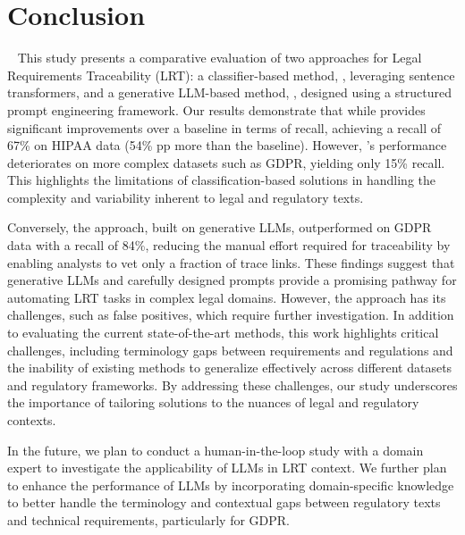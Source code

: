 \section{Conclusion}~\label{sec:conclusion}
This study presents a comparative evaluation of two approaches for Legal Requirements Traceability (LRT): a classifier-based method, \kashif, leveraging sentence transformers, and a generative LLM-based method, \RICE, designed using a structured prompt engineering framework. Our results demonstrate that while \kashif provides significant improvements over a baseline in terms of recall, achieving a recall of 67\% on HIPAA data (54\% pp more than the baseline). However, \kashif's performance deteriorates on more complex datasets such as GDPR, yielding only 15\% recall. This highlights the limitations of classification-based solutions in handling the complexity and variability inherent to legal and regulatory texts.

Conversely, the \RICE approach, built on generative LLMs, outperformed \kashif on GDPR data with a recall of 84\%, reducing the manual effort required for traceability by enabling analysts to vet only a fraction of trace links. These findings suggest that generative LLMs and carefully designed prompts provide a promising pathway for automating LRT tasks in complex legal domains. However, the approach has its challenges, such as false positives, which require further investigation. In addition to evaluating the current state-of-the-art methods, this work highlights critical challenges, including terminology gaps between requirements and regulations and the inability of existing methods to generalize effectively across different datasets and regulatory frameworks. By addressing these challenges, our study underscores the importance of tailoring solutions to the nuances of legal and regulatory contexts.

In the future, we plan to conduct a human-in-the-loop study with a domain expert to investigate the applicability of LLMs in LRT context. We further plan to enhance the performance of LLMs by incorporating domain-specific knowledge to better handle the terminology and contextual gaps between regulatory texts and technical requirements, particularly for GDPR.


